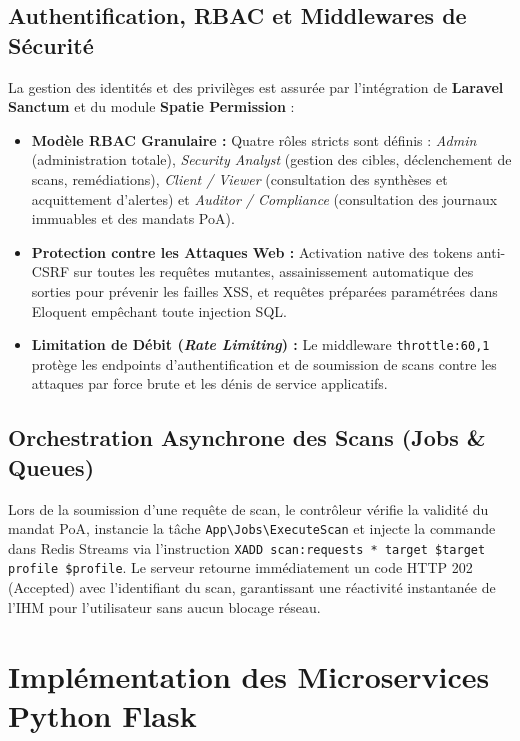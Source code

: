 \subsection{Authentification, RBAC et Middlewares de S\'ecurit\'e}
\par La gestion des identit\'es et des privil\`eges est assur\'ee par l'int\'egration de \textbf{Laravel Sanctum} et du module \textbf{Spatie Permission} :
\begin{itemize}
    \item \textbf{Mod\`ele RBAC Granulaire :} Quatre r\^oles stricts sont d\'efinis : \textit{Admin} (administration totale), \textit{Security Analyst} (gestion des cibles, d\'eclenchement de scans, rem\'ediations), \textit{Client / Viewer} (consultation des synth\`eses et acquittement d'alertes) et \textit{Auditor / Compliance} (consultation des journaux immuables et des mandats PoA).
    \item \textbf{Protection contre les Attaques Web :} Activation native des tokens anti-CSRF sur toutes les requ\^etes mutantes, assainissement automatique des sorties pour pr\'evenir les failles XSS, et requ\^etes pr\'epar\'ees param\'etr\'ees dans Eloquent emp\^echant toute injection SQL.
    \item \textbf{Limitation de D\'ebit (\textit{Rate Limiting}) :} Le middleware \texttt{throttle:60,1} prot\`ege les endpoints d'authentification et de soumission de scans contre les attaques par force brute et les d\'enis de service applicatifs.
\end{itemize}

\subsection{Orchestration Asynchrone des Scans (Jobs \& Queues)}
\par Lors de la soumission d'une requ\^ete de scan, le contr\^oleur v\'erifie la validit\'e du mandat PoA, instancie la t\^ache \texttt{App\textbackslash Jobs\textbackslash ExecuteScan} et injecte la commande dans Redis Streams via l'instruction \texttt{XADD scan:requests * target \$target profile \$profile}. Le serveur retourne imm\'ediatement un code HTTP 202 (Accepted) avec l'identifiant du scan, garantissant une r\'eactivit\'e instantan\'ee de l'IHM pour l'utilisateur sans aucun blocage r\'eseau.

\section{Impl\'ementation des Microservices Python Flask}
